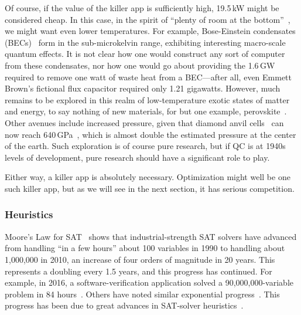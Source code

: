 Of course, if the value of the killer app is sufficiently high,
19.5\,kW might be considered cheap.
In this case, in the spirit of
``plenty of room at the bottom''~\cite{RichardPFeynman1959RoomAtBottom},
we might want even lower temperatures.
For example, Bose-Einstein condensates
(BECs)~\cite{NIST2001BoseEinsteinCondensate}
form in the sub-microkelvin range, exhibiting interesting
macro-scale quantum effects.
It is not clear how one would construct any sort of computer from
these condensates, nor how one would go about providing the 1.6\,GW
required to remove one watt of waste heat from a BEC---after all,
even Emmett Brown's fictional flux capacitor required only 1.21 gigawatts.
However, much remains to be explored in this realm
of low-temperature exotic states of matter and energy, to say
nothing of new materials, for but one example,
perovskite~\cite{ZhengChen2016PerovskiteQDMOFthinFilm}.
Other avenues include increased pressure, given that diamond anvil
cells~\cite{Weir1959DiamondAnvilCell} can now reach
640\,GPa~\cite{LeonidDubrovinsky2012640GPaDiamondAnvilCell},
which is almost double the estimated pressure at the center of the earth.
Such exploration is of course pure research, but if QC is at 1940s levels
of development, pure research should have a significant role to play.

Either way, a killer app is absolutely necessary.
Optimization might well be one such killer app, but as we will see in the
next section, it has serious competition.

\subsubsection{Heuristics}
\label{sec:future:Heuristics}

Moore's Law for SAT~\cite[Fig.~2.3]{Kroening:2008:DPA:1391237} shows
that industrial-strength SAT solvers have advanced from handling
``in a few hours'' about
100 variables in 1990 to handling about 1,000,000 in 2010, an increase
of four orders of magnitude in 20 years.
This represents a doubling every 1.5 years, and this progress has
continued.
For example, in 2016, a software-verification application solved a
90,000,000-variable problem in 84 hours~\cite{LihaoLiang2016VerifyTreeRCU}.
Others have noted similar exponential
progress~\cite{SharadMalik2010SATSolverHistory,SATCompetition2002,vanHarmelen:2007:HKR:1557461,Malik:2009:BST:1536616.1536637,JamesEzick2014ExtremeSAT}.
This progress has been due to great advances in SAT-solver
heuristics~\cite{Kroening:2008:DPA:1391237,Zhang:2002:QEB:647771.734434,SharadMalik2010SATSolverHistory,Malik:2009:BST:1536616.1536637,Audemard:2009:PLC:1661445.1661509}.


